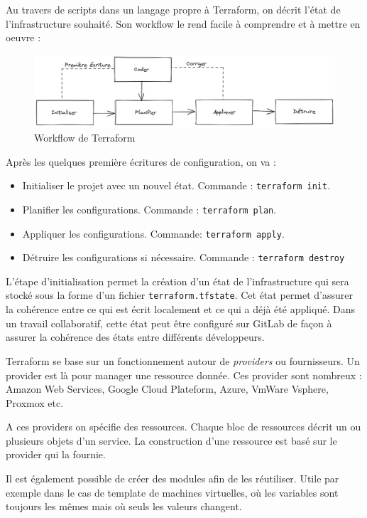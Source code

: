 \documentclass[12pt]{article}
\begin{document}
Au travers de scripts dans un langage propre à Terraform, on décrit l'état de l'infrastructure souhaité. 
Son workflow le rend facile à comprendre et à mettre en oeuvre :
\begin{figure}[!ht]
    \centering
    \includegraphics[width=\textwidth]{src/Terraform_schema.png}
    \caption{Workflow de Terraform}
    \label{fig:terraform_schemal}
\end{figure}

Après les quelques première écritures de configuration, on va :
\begin{itemize}
    \item Initialiser le projet avec un nouvel état. Commande : \texttt{terraform init}.
    \item Planifier les configurations. Commande : \texttt{terraform plan}.
    \item Appliquer les configurations. Commande: \texttt{terraform apply}.
    \item Détruire les configurations si nécessaire. Commande : \texttt{terraform destroy}
\end{itemize}

L'étape d'initialisation permet la création d'un état de l'infrastructure qui sera stocké sous la forme d'un fichier \texttt{terraform.tfstate}. 
Cet état permet d'assurer la cohérence entre ce qui est écrit localement et ce qui a déjà été appliqué. 
Dans un travail collaboratif, cette état peut être configuré sur GitLab de façon à assurer la cohérence des états entre différents développeurs.

Terraform se base sur un fonctionnement autour de \textit{providers} ou fournisseurs. 
Un provider est là pour manager une ressource donnée. Ces provider sont nombreux : Amazon Web Services, Google Cloud Plateform, Azure, VmWare Vsphere, Proxmox etc.

A ces providers on spécifie des ressources. 
Chaque bloc de ressources décrit un ou plusieurs objets d'un service. 
La construction d'une ressource est basé sur le provider qui la fournie.

Il est également possible de créer des modules afin de les réutiliser. 
Utile par exemple dans le cas de template de machines virtuelles, où les variables sont toujours les mêmes mais où seuls les valeurs changent.
\end{document}
